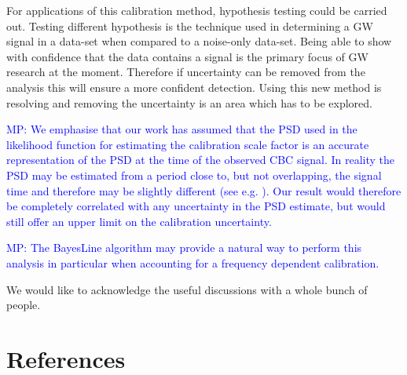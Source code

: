 \documentclass[12pt]{iopart}
\newcommand{\MP}[1]{\textcolor{blue}{MP: #1}}
\begin{document}
For applications of this calibration method, hypothesis testing could be
carried out. Testing different hypothesis is the technique used in determining
a GW signal in a data-set when compared to a noise-only data-set. Being able to
show with confidence that the data contains a signal is the primary focus of GW
research at the moment. Therefore if uncertainty can be removed from the
analysis this will ensure a more confident detection. Using this new method is
resolving and removing the uncertainty is an area which has to be explored.

\MP{We emphasise that our work has assumed that the PSD used in the likelihood function
for estimating the calibration scale factor is an accurate representation of the
PSD at the time of the observed CBC signal. In reality the PSD may be estimated from
a period close to, but not overlapping, the signal time and therefore may be slightly
different (see e.g. \cite{2013PhRvD..88h4044L}). Our result would therefore be completely correlated
with any uncertainty in the PSD estimate, but would still offer an upper limit
on the calibration uncertainty.}

\MP{The BayesLine algorithm \cite{2015PhRvD..91h4034L} may provide a natural
way to perform this analysis in particular when accounting for a frequency
dependent calibration.}

\ack

We would like to acknowledge the useful discussions with a whole bunch
of people.

\section*{References}



\end{document}
